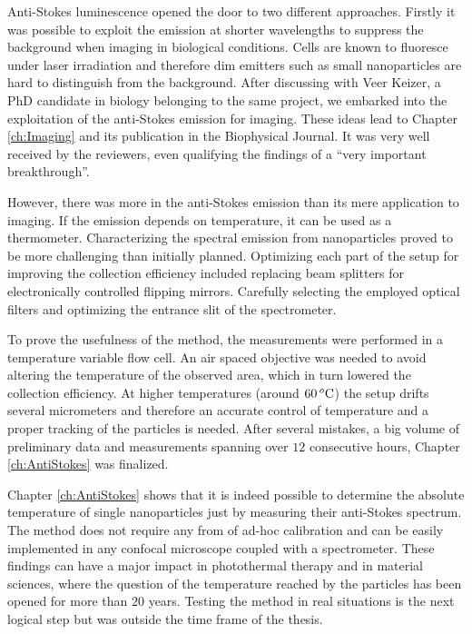 Anti-Stokes luminescence opened the door to two different approaches. Firstly it
was possible to exploit the emission at shorter wavelengths to suppress the
background when imaging in biological conditions. Cells are known to fluoresce
under laser irradiation and therefore dim emitters such as small nanoparticles
are hard to distinguish from the background. After discussing with Veer Keizer,
a PhD candidate in biology belonging to the same project, we embarked into the
exploitation of the anti-Stokes emission for imaging. These ideas lead to
Chapter \ref{ch:Imaging} and its publication in the Biophysical Journal. It was
very well received by the reviewers, even qualifying the findings of a ``very
important breakthrough''.

However, there was more in the anti-Stokes emission than its mere application
to imaging. If the emission depends on temperature, it can be used as a
thermometer. Characterizing the spectral emission from nanoparticles proved to
be more challenging than initially planned. Optimizing each part of the setup
for improving the collection efficiency included replacing beam splitters for
electronically controlled flipping mirrors. Carefully selecting the
employed optical filters and optimizing the entrance slit of the spectrometer.

To prove the usefulness of the method, the measurements were performed in a
temperature variable flow cell. An air spaced objective was needed to avoid
altering the temperature of the observed area, which in turn lowered the
collection efficiency. At higher temperatures (around $60\,^o\textrm{C}$) the setup
drifts several micrometers and therefore an accurate control of temperature and
a proper tracking of the particles is needed. After several mistakes, a big
volume of preliminary data and measurements spanning over $12$ consecutive
hours, Chapter \ref{ch:AntiStokes} was finalized. 

Chapter \ref{ch:AntiStokes} shows that it is indeed possible to determine the
absolute temperature of single nanoparticles just by measuring their anti-Stokes
spectrum. The method does not require any from of ad-hoc calibration and can be
easily implemented in any confocal microscope coupled with a spectrometer. These
findings can have a major impact in photothermal therapy and in material
sciences, where the question of the temperature reached by the particles has
been opened for more than $20$ years. Testing the method in real situations is
the next logical step but was outside the time frame of the thesis.

